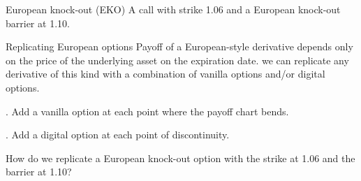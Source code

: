 \documentclass{beamer}
\begin{document}
\begin{frame}{European knock-out (EKO)}
\justify
A call with strike 1.06 and a European knock-out barrier at 1.10.
\centering
\end{frame}



\begin{frame}{Replicating European options}
\justify
Payoff of a European-style derivative depends only on the price of the underlying asset on the expiration date. we can replicate any derivative of this kind with a combination of vanilla options and/or digital options.

. Add a vanilla option at each point where the payoff chart bends.

. Add a digital option at each point of discontinuity.

\justify
How do we replicate a European knock-out option with the strike at 1.06 and the barrier at 1.10?
\end{frame}
\end{document}
